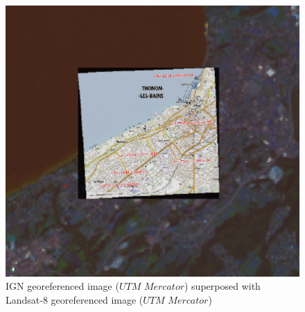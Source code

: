 \documentclass{beamer}
\begin{document}
\begin{frame}
    \centering
    \begin{figure}
        \includegraphics[scale=0.09]{images/georeferencing/qgis-superposition0.png}
        \caption{IGN georeferenced image ($UTM$ $Mercator$) superposed with Landsat-8 georeferenced image ($UTM$ $Mercator$) }
    \end{figure}

\end{frame}
\end{document}
